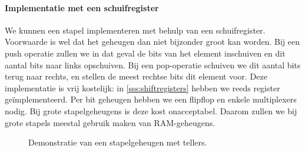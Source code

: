 \paragraph{Implementatie met een schuifregister}
We kunnen een stapel implementeren met behulp van een schuifregister. Voorwaarde is wel dat het geheugen dan niet bijzonder groot kan worden. Bij een push operatie zullen we in dat geval de bits van het element inschuiven en dit aantal bits naar links opschuiven. Bij een pop-operatie schuiven we dit aantal bits terug naar rechts, en stellen de meest rechtse bits dit element voor. Deze implementatie is vrij kostelijk: in \ref{sss:shiftregisters} hebben we reeds register ge\"implementeerd. Per bit geheugen hebben we een flipflop en enkele multiplexers nodig. Bij grote stapelgeheugens is deze kost onacceptabel. Daarom zullen we bij grote stapels meestal gebruik maken van RAM-geheugens.
\begin{figure}[hbt]
\centering
{}
\caption{Demonstratie van een stapelgeheugen met tellers.}
\end{figure}
